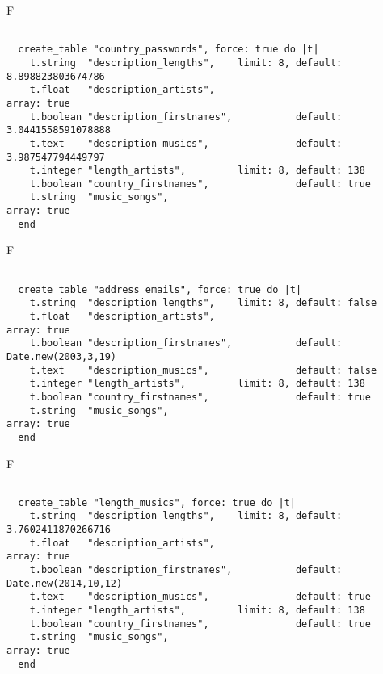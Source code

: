 F
\begin{verbatim}

  create_table "country_passwords", force: true do |t|
    t.string  "description_lengths",    limit: 8, default: 8.898823803674786
    t.float   "description_artists",                                                     array: true
    t.boolean "description_firstnames",           default: 3.0441558591078888
    t.text    "description_musics",               default: 3.987547794449797
    t.integer "length_artists",         limit: 8, default: 138
    t.boolean "country_firstnames",               default: true
    t.string  "music_songs",                                                             array: true
  end

\end{verbatim}

F
\begin{verbatim}

  create_table "address_emails", force: true do |t|
    t.string  "description_lengths",    limit: 8, default: false
    t.float   "description_artists",                                                     array: true
    t.boolean "description_firstnames",           default: Date.new(2003,3,19)
    t.text    "description_musics",               default: false
    t.integer "length_artists",         limit: 8, default: 138
    t.boolean "country_firstnames",               default: true
    t.string  "music_songs",                                                             array: true
  end

\end{verbatim}

F
\begin{verbatim}

  create_table "length_musics", force: true do |t|
    t.string  "description_lengths",    limit: 8, default: 3.7602411870266716
    t.float   "description_artists",                                                     array: true
    t.boolean "description_firstnames",           default: Date.new(2014,10,12)
    t.text    "description_musics",               default: true
    t.integer "length_artists",         limit: 8, default: 138
    t.boolean "country_firstnames",               default: true
    t.string  "music_songs",                                                             array: true
  end

\end{verbatim}

